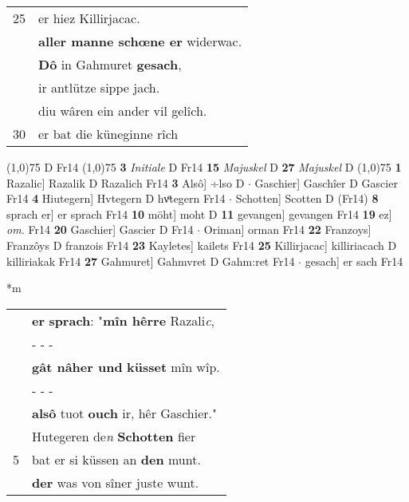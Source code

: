 \documentclass[8pt,a4paper,notitlepage]{article}
\begin{document}
\begin{table}[ht]
\begin{minipage}[t]{0.5\linewidth}
\begin{tabular}{rl}
25 & er hiez Killirjacac.\\ 
 & \textbf{aller manne schœne er} widerwac.\\ 
 & \textbf{Dô} in Gahmuret \textbf{gesach},\\ 
 & ir antlütze sippe jach.\\ 
 & diu wâren ein ander vil gelîch.\\ 
30 & er bat die küneginne rîch\\ 
\end{tabular}
\scriptsize
\line(1,0){75} \newline
D Fr14 \newline
\line(1,0){75} \newline
\textbf{3} \textit{Initiale} D Fr14  \textbf{15} \textit{Majuskel} D  \textbf{27} \textit{Majuskel} D  \newline
\line(1,0){75} \newline
\textbf{1} Razalic] Razalik D Razalich Fr14 \textbf{3} Alsô] ÷lso D  $\cdot$ Gaschier] Gaschîer D Gascier Fr14 \textbf{4} Hiutegern] Hvtegern D hvͦtegern Fr14  $\cdot$ Schotten] Scotten D (Fr14) \textbf{8} sprach er] er sprach Fr14 \textbf{10} möht] moht D \textbf{11} gevangen] gevangen Fr14 \textbf{19} ez] \textit{om.} Fr14 \textbf{20} Gaschier] Gascier D Fr14  $\cdot$ Oriman] orman Fr14 \textbf{22} Franzoys] Franzôys D franzois Fr14 \textbf{23} Kayletes] kailets Fr14 \textbf{25} Killirjacac] killiriacach D killiriakak Fr14 \textbf{27} Gahmuret] Gahmvret D Gahm:ret Fr14  $\cdot$ gesach] er sach Fr14 \newline
\end{minipage}
\hspace{0.5cm}
\begin{minipage}[t]{0.5\linewidth}
\small
\begin{center}*m
\end{center}
\begin{tabular}{rl}
 & \textbf{er} \textbf{sprach}: "\textbf{mîn hêrre} Razali\textit{c},\\ 
 & \multicolumn{1}{l}{ - - - }\\ 
 & \textbf{gât nâher und} \textbf{küsset} mîn wîp.\\ 
 & \multicolumn{1}{l}{ - - - }\\ 
 & \textbf{alsô} tuot \textbf{ouch} ir, hêr Gaschier."\\ 
 & Hutegeren de\textit{n} \textbf{Schotten} fier\\ 
5 & bat er si küssen an \textbf{den} munt.\\ 
 & \textbf{der} was von sîner juste wunt.\\ 

\end{tabular}
\end{minipage}
\end{table}
\end{document}
